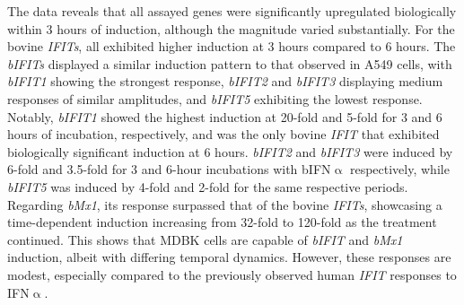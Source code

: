 The data reveals that all assayed genes were significantly upregulated biologically within 3 hours of induction, although the magnitude varied substantially. For the bovine \textit{IFITs}, all exhibited higher induction at 3 hours compared to 6 hours. The \textit{bIFITs} displayed a similar induction pattern to that observed in A549 cells, with \textit{bIFIT1} showing the strongest response, \textit{bIFIT2} and \textit{bIFIT3} displaying medium responses of similar amplitudes, and \textit{bIFIT5} exhibiting the lowest response. Notably, \textit{bIFIT1} showed the highest induction at 20-fold and 5-fold for 3 and 6 hours of incubation, respectively, and was the only bovine \textit{IFIT} that exhibited biologically significant induction at 6 hours. \textit{bIFIT2} and \textit{bIFIT3} were induced by 6-fold and 3.5-fold for 3 and 6-hour incubations with bIFN$\upalpha$ respectively, while \textit{bIFIT5} was induced by 4-fold and 2-fold for the same respective periods. Regarding \textit{bMx1}, its response surpassed that of the bovine \textit{IFITs}, showcasing a time-dependent induction increasing from 32-fold to 120-fold as the treatment continued. This shows that MDBK cells are capable of \textit{bIFIT} and \textit{bMx1} induction, albeit with differing temporal dynamics. However, these responses are modest, especially compared to the previously observed human \textit{IFIT} responses to IFN$\upalpha$.

